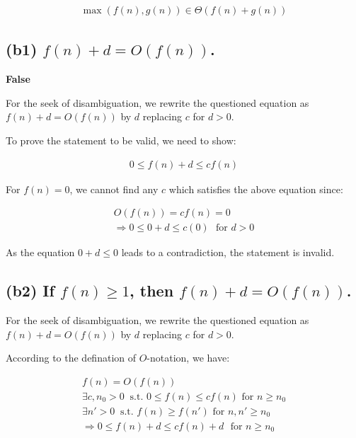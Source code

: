 \documentclass[12pt]{article}
\begin{document}
\begin{gather}
    \max(f(n), g(n)) \in \Theta (f(n) + g(n))
\end{gather}


\subsection{(b1) $f(n) + d = O(f(n))$.}

\textbf{False}

For the seek of disambiguation, we rewrite the questioned equation as $f(n) + d = O(f(n))$ by $d$ replacing $c$ for $d > 0$.

To prove the statement to be valid, we need to show:

\begin{gather}
    0 \leq f(n) + d \leq cf(n)
\end{gather}


For $f(n) = 0$, we cannot find any $c$ which satisfies the above equation since:

\begin{gather}
    O(f(n)) = cf(n) = 0  \nonumber \\
    \Rightarrow 0 \leq 0 + d \leq c(0) \ \ \ \text{for $d > 0$}
\end{gather}

As the equation $0 + d \leq 0$ leads to a contradiction, the statement is invalid.


\subsection{(b2) If $f(n) \geq 1$, then $f(n) + d = O(f(n))$.}

For the seek of disambiguation, we rewrite the questioned equation as $f(n) + d = O(f(n))$ by $d$ replacing $c$ for $d > 0$.


According to the defination of $O$-notation, we have:

\begin{gather}
 f(n) = O(f(n)) \nonumber\\
 \exists c, n_{0} > 0 \ \text{ s.t.  $0 \leq f(n) \leq cf(n)$ \ \ \ for $n \geq n_{0}$} \\
 \exists n' > 0 \ \text{ s.t.  $f(n) \geq f(n')$ \ \ \ for $n, n' \geq n_{0}$} \\
 \Rightarrow 0 \leq f(n)+d \leq cf(n) + d \ \ \ \text{for $n \geq n_{0}$}
\end{gather}
\end{document}

